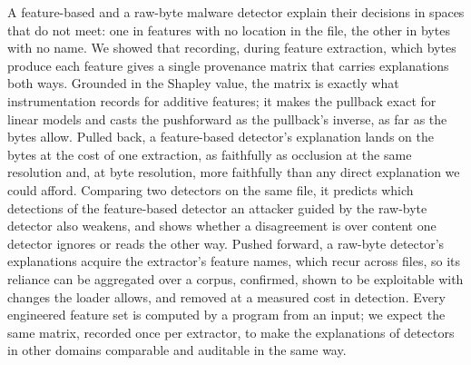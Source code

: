 A feature-based and a raw-byte malware detector explain their decisions in spaces that do not meet: one in features
with no location in the file, the other in bytes with no name. We showed that recording, during feature extraction,
which bytes produce each feature gives a single provenance matrix that carries explanations both ways. Grounded in the
Shapley value, the matrix is exactly what instrumentation records for additive features; it makes the pullback exact
for linear models and casts the pushforward as the pullback's inverse, as far as the bytes allow. Pulled back, a
feature-based detector's explanation lands on the bytes at the cost of one extraction, as faithfully as occlusion at the
same resolution and, at byte resolution, more faithfully than any direct explanation we could afford. Comparing two
detectors on the same file, it predicts which detections of the feature-based detector an attacker guided by the
raw-byte detector also weakens, and shows whether a disagreement is over content one detector ignores or reads the other
way. Pushed forward, a raw-byte detector's explanations acquire the extractor's feature names, which recur across files,
so its reliance can be aggregated over a corpus, confirmed, shown to be exploitable with changes the loader allows, and
removed at a measured cost in detection. Every engineered feature set is computed by a program from an input; we expect
the same matrix, recorded once per extractor, to make the explanations of detectors in other domains comparable and
auditable in the same way.
